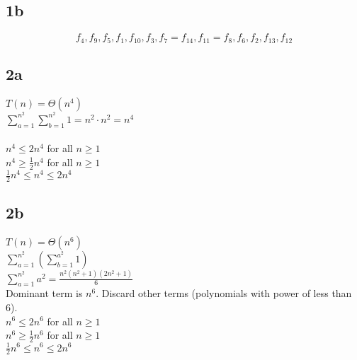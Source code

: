 \documentclass[14pt]{extarticle}
\begin{document}
\subsection*{1b}

\[
f_4, f_9, f_5, f_1, f_{10}, f_3, f_7 = f_{14}, f_{11} = f_8, f_6, f_2, f_{13}, f_{12}
\]



\subsection*{2a}

$T(n) = \Theta(n^4)$ \\
$\sum_{a=1}^{n^2} \sum_{b=1}^{n^2} 1 = n^2 \cdot n^2 = n^4$ \\ \\
$n^4 \leq 2n^4$ for all $n \geq 1$ \\
$n^4 \geq \frac{1}{2}n^4$ for all $n \geq 1$ \\
$\frac{1}{2}n^4 \leq n^4 \leq 2n^4$ \\


\subsection*{2b}

$T(n) = \Theta(n^6)$  \\
$\sum_{a=1}^{n^2} \left( \sum_{b=1}^{a^2} 1 \right)$ \\
$\sum_{a=1}^{n^2} a^2 = \frac{n^2(n^2 + 1)(2n^2 + 1)}{6}$ \\
Dominant term is $n^{6}$. Discard other terms (polynomials with power of less than 6). \\
$n^6 \leq 2n^6$ for all $n \geq 1$ \\
$n^6 \geq \frac{1}{2}n^6$ for all $n \geq 1$ \\
$\frac{1}{2}n^6 \leq n^6 \leq 2n^6$ \\
\end{document}
